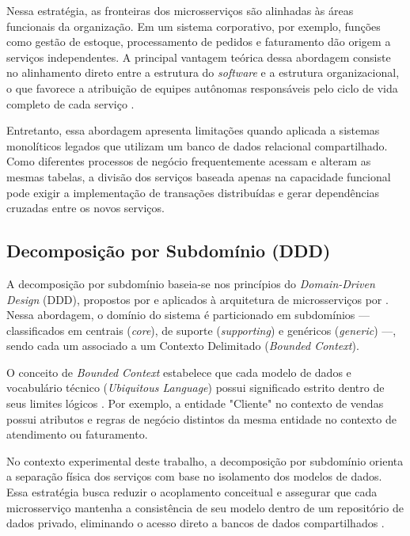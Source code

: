 Nessa estratégia, as fronteiras dos microsserviços são alinhadas às áreas funcionais da organização. Em um sistema corporativo, por exemplo, funções como gestão de estoque, processamento de pedidos e faturamento dão origem a serviços independentes. A principal vantagem teórica dessa abordagem consiste no alinhamento direto entre a estrutura do \textit{software} e a estrutura organizacional, o que favorece a atribuição de equipes autônomas responsáveis pelo ciclo de vida completo de cada serviço \cite{newman2021}.

Entretanto, essa abordagem apresenta limitações quando aplicada a sistemas monolíticos legados que utilizam um banco de dados relacional compartilhado. Como diferentes processos de negócio frequentemente acessam e alteram as mesmas tabelas, a divisão dos serviços baseada apenas na capacidade funcional pode exigir a implementação de transações distribuídas e gerar dependências cruzadas entre os novos serviços.

\subsection{Decomposição por Subdomínio (DDD)}

A decomposição por subdomínio baseia-se nos princípios do \textit{Domain-Driven Design} (DDD), propostos por  e aplicados à arquitetura de microsserviços por . Nessa abordagem, o domínio do sistema é particionado em subdomínios — classificados em centrais (\textit{core}), de suporte (\textit{supporting}) e genéricos (\textit{generic}) —, sendo cada um associado a um Contexto Delimitado (\textit{Bounded Context}).

O conceito de \textit{Bounded Context} estabelece que cada modelo de dados e vocabulário técnico (\textit{Ubiquitous Language}) possui significado estrito dentro de seus limites lógicos \cite{evans2003}. Por exemplo, a entidade "Cliente" no contexto de vendas possui atributos e regras de negócio distintos da mesma entidade no contexto de atendimento ou faturamento.

No contexto experimental deste trabalho, a decomposição por subdomínio orienta a separação física dos serviços com base no isolamento dos modelos de dados. Essa estratégia busca reduzir o acoplamento conceitual e assegurar que cada microsserviço mantenha a consistência de seu modelo dentro de um repositório de dados privado, eliminando o acesso direto a bancos de dados compartilhados \cite{newman2020}.

